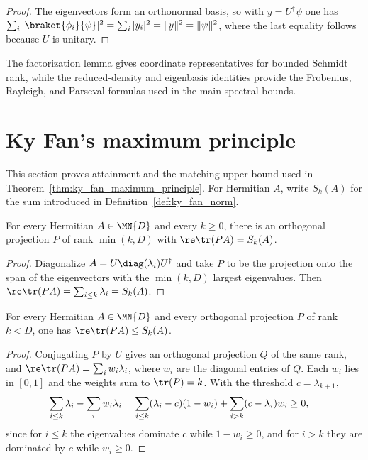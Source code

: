\begin{proof}
    \leanok
    The eigenvectors form an orthonormal basis, so with $y=U^\dagger\psi$ one
    has
    $\sum_i|\braket{\phi_i}{\psi}|^2=\sum_i|y_i|^2=\|y\|^2=\|\psi\|^2$,
    where the last equality follows because $U$ is unitary.
\end{proof}

The factorization lemma gives coordinate representatives for bounded Schmidt
rank, while the reduced-density and eigenbasis identities provide the
Frobenius, Rayleigh, and Parseval formulas used in the main spectral bounds.

\section{Ky Fan's maximum principle}
\label{sec:app_positive_not_cp_ky_fan}

This section proves attainment and the matching upper bound used in
Theorem~\ref{thm:ky_fan_maximum_principle}. For Hermitian $A$, write $S_k(A)$
for the sum introduced in Definition~\ref{def:ky_fan_norm}.

\begin{theorem}
    \label{thm:ky_fan_achievability}
    \leanok
    For every Hermitian $A\in\MN{D}$ and every $k\ge0$, there is an orthogonal
    projection $P$ of rank $\min(k,D)$ with $\re\tr(PA)=S_k(A)$.
\end{theorem}

\begin{proof}\leanok
    Diagonalize $A=U\diag(\lambda_i)U^\dagger$ and take $P$ to be the
    projection onto the span of the eigenvectors with the $\min(k,D)$ largest
    eigenvalues. Then $\re\tr(PA)=\sum_{i\le k}\lambda_i=S_k(A)$.
\end{proof}

\begin{theorem}
    \label{thm:ky_fan_upper_bound}
    \leanok
    For every Hermitian $A\in\MN{D}$ and every orthogonal projection $P$ of
    rank $k<D$, one has $\re\tr(PA)\le S_k(A)$.
\end{theorem}

\begin{proof}\leanok
    Conjugating $P$ by $U$ gives an orthogonal projection $Q$ of the same
    rank, and $\re\tr(PA)=\sum_iw_i\lambda_i$, where $w_i$ are the diagonal
    entries of $Q$. Each $w_i$ lies in $[0,1]$ and the weights sum to
    $\tr(P)=k$. With the threshold $c=\lambda_{k+1}$,
    \begin{align}
        \sum_{i\le k}\lambda_i-\sum_iw_i\lambda_i
         & =\sum_{i\le k}(\lambda_i-c)(1-w_i)
        +\sum_{i>k}(c-\lambda_i)w_i
        \ge0,
        \notag
    \end{align}
    since for $i\le k$ the eigenvalues dominate $c$ while $1-w_i\ge0$, and
    for $i>k$ they are dominated by $c$ while $w_i\ge0$.
\end{proof}

